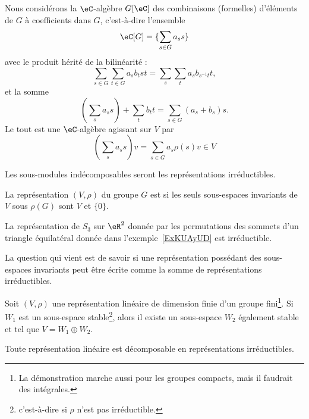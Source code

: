 Nous considérons la \( \eC\)-algèbre \( G[\eC]\) des combinaisons (formelles) d'éléments de \( G\) à coefficients dans \( G\), c'est-à-dire l'ensemble
\begin{equation}
	\eC[G]=\{ \sum_{s\in G}a_ss \}
\end{equation}
avec le produit hérité de la bilinéarité :
\begin{equation}
	\sum_{s\in G}\sum_{t\in G}a_sb_tst=\sum_s\sum_t a_sb_{s^{-1}t}t,
\end{equation}
et la somme
\begin{equation}
	(\sum_sa_ss)+\sum_tb_tt=\sum_{s\in G}(a_s+b_s)s.
\end{equation}
Le tout est une \( \eC\)-algèbre agissant sur \( V\) par
\begin{equation}
	\left( \sum_sa_ss \right)v=\sum_{s\in G}a_s\rho(s)v\in V
\end{equation}

Les sous-modules indécomposables seront les représentations irréductibles.

\begin{definition}
	La représentation \( (V,\rho)\) du groupe \( G\) est  si les seuls sous-espaces invariants de \( V\) sous \( \rho(G)\) sont \( V\) et \( \{ 0 \}\).
\end{definition}

\begin{example}
	La représentation de \( S_3\) sur \( \eR^2\) donnée par les permutations des sommets d'un triangle équilatéral donnée dans l'exemple~\ref{ExKUAyUD} est irréductible.
\end{example}

La question qui vient est de savoir si une représentation possédant des sous-espaces invariants peut être écrite comme la somme de représentations irréductibles.

\begin{proposition} \label{PropHeyoAN}  
	Soit \( (V,\rho)\) une représentation linéaire de dimension finie d'un groupe fini\footnote{La démonstration marche aussi pour les groupes compacts, mais il faudrait des intégrales.}. Si \( W_1\) est un sous-espace stable\footnote{c'est-à-dire si \( \rho\) n'est pas irréductible.}, alors il existe un sous-espace \( W_2\) également stable et tel que \( V=W_1\oplus W_2\).

	Toute représentation linéaire est décomposable en représentations irréductibles.
\end{proposition}

